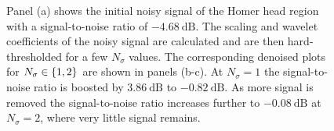 \begin{figure}[htp]
	\centering
	\hfill
	\hfill
	\caption{
		Panel (a) shows the initial noisy signal of the Homer head region with a signal-to-noise ratio of \(-\SI{4.68}{\dB}\).
		The scaling and wavelet coefficients of the noisy signal are calculated and are then hard-thresholded for a few \(N_{\sigma}\) values.
		The corresponding denoised plots for \(N_{\sigma} \in \{1, 2\}\) are shown in panels (b-c).
		At \(N_{\sigma}=1\) the signal-to-noise ratio is boosted by \(\SI{3.86}{\dB}\) to \(-\SI{0.82}{\dB}\).
		As more signal is removed the signal-to-noise ratio increases further to \(-\SI{0.08}{\dB}\) at \(N_{\sigma}=2\), where very little signal remains.
	}\label{fig:chapter4_denoising}
\end{figure}
